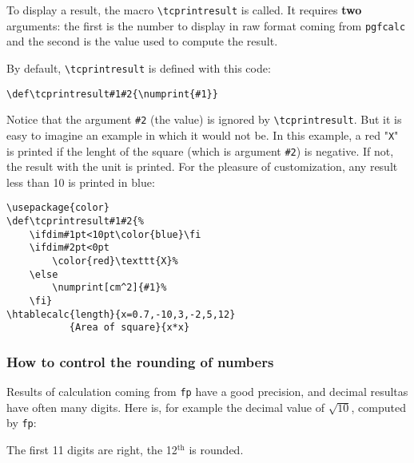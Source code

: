 \documentclass[a4paper,10pt]{article}
\newcommand\verbinline{\lstinline[breaklines=false,basicstyle=\normalsize\ttfamily]}
\newcommand\mywidth{0.85\linewidth}
\begin{document}
To display a result, the macro \verbinline|\tcprintresult| is called. It requires \textbf{two} arguments: the first is the number to display in raw format coming from \verb|pgfcalc| and the second is the value used to compute the result.

By default, \verbinline|\tcprintresult| is defined with this code:\par\nobreak\smallskip
\hfill\verbinline|\def\tcprintresult#1#2{\numprint{#1}}|\hfill{}
\smallskip

Notice that the argument \verb|#2| (the value) is ignored by \verbinline|\tcprintresult|. But it is easy to imagine an example in which it would not be. In this example, a red "\verb|X|" is printed if the lenght of the square (which is argument \verb|#2|) is negative. If not, the result with the unit is printed. For the pleasure of customization, any result less than 10 is printed in blue:\par\nobreak
\begin{center}
\begin{minipage}{\mywidth}
\begin{lstlisting}
\usepackage{color}
\def\tcprintresult#1#2{%
	\ifdim#1pt<10pt\color{blue}\fi
	\ifdim#2pt<0pt
		\color{red}\texttt{X}%
	\else
		\numprint[cm^2]{#1}%
	\fi}
\htablecalc{length}{x=0.7,-10,3,-2,5,12}
           {Area of square}{x*x}
\end{lstlisting}
\end{minipage}
\smallskip
\def\tcprintresult#1#2{%
	\ifdim#1pt<10pt\color{blue}\fi
	\ifdim#2pt<0pt
		\color{red}\texttt{X}%
	\else
		\numprint[cm^2]{#1}%
	\fi}
\end{center}

\subsubsection{How to control the rounding of numbers}
Results of calculation coming from \verb=fp= have a good precision, and decimal resultas have often many digits. Here is, for example the decimal value of $\sqrt{10}$, computed by \verb=fp=:
\begin{center}\FPeval{}\numprint\truc\end{center}
The first 11 digits are right, the 12${}^{\text{th}}$ is rounded.\medskip
\end{document}
